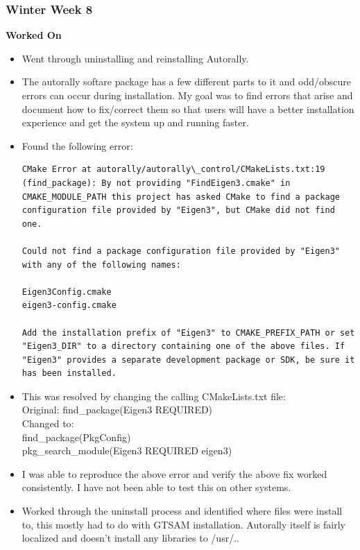 \documentclass[compsoc,draftclsnofoot,onecolumn,10pt]{IEEEtran}
\begin{document}
\subsubsection*{Winter Week 8}
\textbf{Worked On}
\begin{itemize}
    \item Went through uninstalling and reinstalling Autorally.
    \item The autorally softare package has a few different parts to it and odd/obscure errors can occur during installation. My goal was to find errors that arise and document how to fix/correct them so that users will have a better installation experience and get the system up and running faster.

    \item Found the following error:
\begin{verbatim}
CMake Error at autorally/autorally\_control/CMakeLists.txt:19 (find_package): By not providing "FindEigen3.cmake" in CMAKE_MODULE_PATH this project has asked CMake to find a package configuration file provided by "Eigen3", but CMake did not find one.

Could not find a package configuration file provided by "Eigen3" with any of the following names:

Eigen3Config.cmake
eigen3-config.cmake

Add the installation prefix of "Eigen3" to CMAKE_PREFIX_PATH or set "Eigen3_DIR" to a directory containing one of the above files. If "Eigen3" provides a separate development package or SDK, be sure it has been installed.
\end{verbatim}

\item This was resolved by changing the calling CMakeLists.txt file:\\
Original: find\_package(Eigen3 REQUIRED)\\
Changed to:\\
find\_package(PkgConfig)\\
pkg\_search\_module(Eigen3 REQUIRED eigen3)\\

\item I was able to reproduce the above error and verify the above fix worked consistently. I have not been able to test this on other systems.

\item Worked through the uninstall process and identified where files were install to, this mostly had to do with GTSAM installation. Autorally itself is fairly localized and doesn't install any libraries to /usr/..


\end{itemize}
\end{document}
